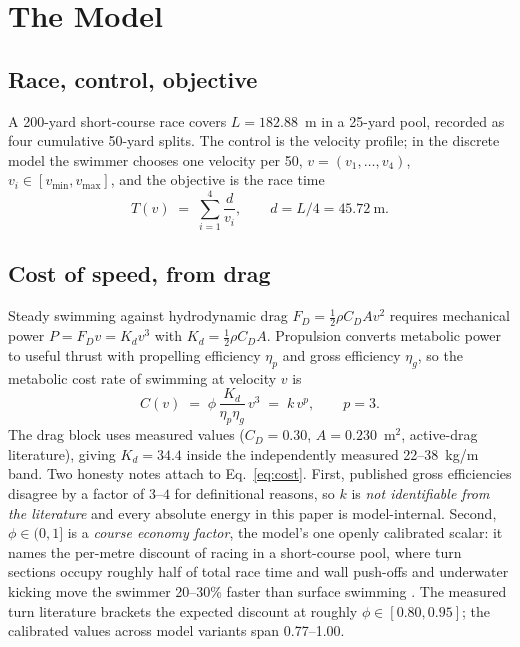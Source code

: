 \section{The Model}\label{sec:model}

\subsection{Race, control, objective}

A 200-yard short-course race covers $L = 182.88$~m in a 25-yard pool,
recorded as four cumulative 50-yard splits. The control is the velocity
profile; in the discrete model the swimmer chooses one velocity per 50,
$v = (v_1,\dots,v_4)$, $v_i \in [v_{\min}, v_{\max}]$, and the objective is
the race time
\begin{equation}
  T(v) \;=\; \sum_{i=1}^{4} \frac{d}{v_i},
  \qquad d = L/4 = 45.72~\text{m}.
  \label{eq:objective}
\end{equation}

\subsection{Cost of speed, from drag}

Steady swimming against hydrodynamic drag $F_D = \tfrac12 \rho C_D A v^2$
requires mechanical power $P = F_D v = K_d v^3$ with
$K_d = \tfrac12 \rho C_D A$. Propulsion converts metabolic power to useful
thrust with propelling efficiency $\eta_p$ and gross efficiency $\eta_g$, so
the metabolic cost rate of swimming at velocity $v$ is
\begin{equation}
  C(v) \;=\; \phi\,\frac{K_d}{\eta_p \eta_g}\, v^{3}
        \;=\; k\, v^{p}, \qquad p = 3 .
  \label{eq:cost}
\end{equation}
The drag block uses measured values ($C_D = 0.30$, $A = 0.230$~m$^2$,
active-drag literature), giving $K_d = 34.4$ inside the independently
measured 22--38~kg/m band. Two honesty notes attach to
Eq.~\eqref{eq:cost}. First, published gross efficiencies disagree by a factor
of $3$--$4$ for definitional reasons, so $k$ is \emph{not identifiable from
the literature} and every absolute energy in this paper is model-internal.
Second, $\phi \in (0,1]$ is a \emph{course economy factor}, the model's one
openly calibrated scalar: it names the per-metre discount of racing in a
short-course pool, where turn sections occupy roughly half of total race time
and wall push-offs and underwater kicking move the swimmer 20--30\% faster
than surface swimming \citep{cuencafernandez2022turn, born2022imsections,
veiga2022underwater}. The measured turn literature brackets the expected
discount at roughly $\phi \in [0.80, 0.95]$; the calibrated values across
model variants span 0.77--1.00.

